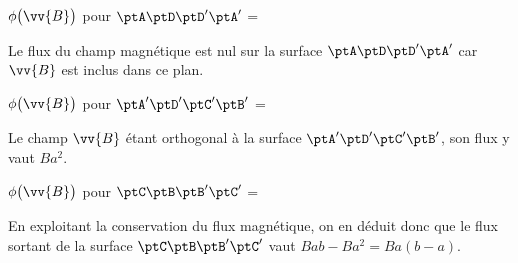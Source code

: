 \begin{enonce}
$\phi \big(\vv{B} \big)$ pour $\ptA\ptD\ptD'\ptA'$ =
\end{enonce}

\begin{corrige}
Le flux du champ magnétique est nul sur la surface $\ptA\ptD\ptD'\ptA'$ car $\vv{B}$ est inclus dans ce plan.
\end{corrige}




\begin{enonce}
$\phi \big(\vv{B} \big)$ pour $\ptA'\ptD'\ptC'\ptB'$ =
\end{enonce}

\begin{corrige}
Le champ $\vv{B}$ étant orthogonal à la surface $\ptA'\ptD'\ptC'\ptB'$, son flux y vaut $Ba^{2}$.
\end{corrige}




\begin{enonce}
$\phi \big(\vv{B} \big)$ pour $\ptC\ptB\ptB'\ptC'$ =
\end{enonce}

\begin{corrige}
En exploitant la conservation du flux magnétique, on en déduit donc que le flux sortant de la surface $\ptC\ptB\ptB'\ptC'$ vaut $Bab-Ba^{2}=Ba\left(b-a\right)$.
\end{corrige}


\finEntrainement









